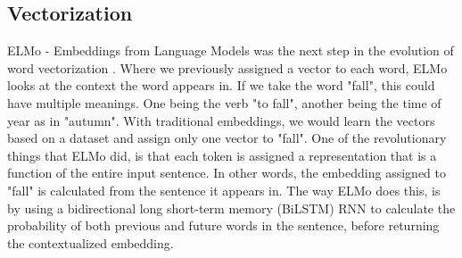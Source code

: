 \documentclass{report}
\begin{document}
\subsection{Vectorization}
ELMo - Embeddings from Language Models was the next step in the evolution of word vectorization \cite{Peters:2018}. Where we previously assigned a vector to each word, ELMo looks at the context the word appears in. If we take the word "fall", this could have multiple meanings. One being the verb "to fall", another being the time of year as in "autumn". With traditional embeddings, we would learn the vectors based on a dataset and assign only one vector to "fall". One of the revolutionary things that ELMo did, is that each token is assigned a representation that is a function of the entire input sentence. In other words, the embedding assigned to "fall" is calculated from the sentence it appears in. The way ELMo does this, is by using a bidirectional long short-term memory (BiLSTM) RNN to calculate the probability of both previous and future words in the sentence, before returning the contextualized embedding.
\end{document}
